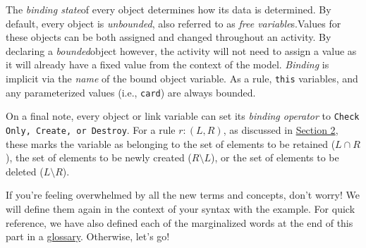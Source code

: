 The \emph{binding state}of every object determines how its data is determined. By default, every object is \emph{unbounded}, also referred
to as \emph{free variable}s.Values for these objects can be both assigned and changed throughout an activity. By declaring a
\emph{bounded}object however, the activity will not need to assign a value as it will already have a fixed value from the
context of the model.
\emph{Binding} is implicit via the \emph{name} of the bound object variable. As a rule, \texttt{this} variables, and any parameterized values (i.e., \texttt{card}) are always
bounded.

On a final note, every object or link variable can set its \emph{binding operator} to \texttt{Check Only, Create, or Destroy}. For a rule $r: (L,
R)$, as discussed in \hyperlink{explanation}{Section 2}, these marks the variable as belonging to the set of elements to be retained ($L\cap R$), the set of
elements to be newly created ($R\setminus L$), or the set of elements to be deleted ($L\setminus R$).

If you're feeling overwhelmed by all the new terms and concepts, don't worry! We will define them again in the context of your syntax with the example. For
quick reference, we have also defined each of the marginalized words at the end of this part in a \hyperlink{glossary}{glossary}. Otherwise, let's go!









